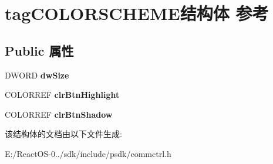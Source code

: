 \hypertarget{structtag_c_o_l_o_r_s_c_h_e_m_e}{}\section{tag\+C\+O\+L\+O\+R\+S\+C\+H\+E\+M\+E结构体 参考}
\label{structtag_c_o_l_o_r_s_c_h_e_m_e}
\subsection*{Public 属性}
\begin{DoxyCompactItemize}
\item 
\mbox{\label{structtag_c_o_l_o_r_s_c_h_e_m_e_a66f27fb7cde0efbb7ecb88ba902d48d1}} 
D\+W\+O\+RD {\bfseries dw\+Size}
\item 
\mbox{\label{structtag_c_o_l_o_r_s_c_h_e_m_e_a8423206cd06fb77ba62ecd7b9fd2a086}} 
C\+O\+L\+O\+R\+R\+EF {\bfseries clr\+Btn\+Highlight}
\item 
\mbox{\label{structtag_c_o_l_o_r_s_c_h_e_m_e_a0f4c7284c45dc40972536d92b10c9e7a}} 
C\+O\+L\+O\+R\+R\+EF {\bfseries clr\+Btn\+Shadow}
\end{DoxyCompactItemize}


该结构体的文档由以下文件生成\+:\begin{DoxyCompactItemize}
\item 
E\+:/\+React\+O\+S-\/0../sdk/include/psdk/commctrl.\+h\end{DoxyCompactItemize}
